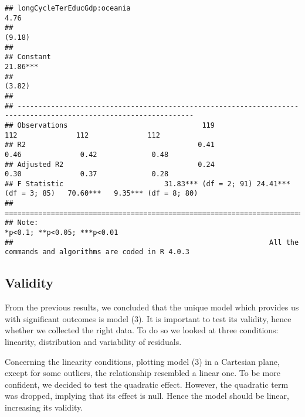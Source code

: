 \documentclass[
]{article}
\begin{document}
\begin{verbatim}
## longCycleTerEducGdp:oceania                                                                         4.76        
##                                                                                                    (9.18)       
##                                                                                                                 
## Constant                                                                         21.86***                       
##                                                                                   (3.82)                        
##                                                                                                                 
## ----------------------------------------------------------------------------------------------------------------
## Observations                                119                   112              112              112         
## R2                                         0.41                  0.46              0.42             0.48        
## Adjusted R2                                0.24                  0.30              0.37             0.28        
## F Statistic                        31.83*** (df = 2; 91) 24.41*** (df = 3; 85)   70.60***   9.35*** (df = 8; 80)
## ================================================================================================================
## Note:                                                                                *p<0.1; **p<0.05; ***p<0.01
##                                                             All the commands and algorithms are coded in R 4.0.3
\end{verbatim}

\hypertarget{validity}{%
\subsection{Validity}\label{validity}}

From the previous results, we concluded that the unique model which
provides us with significant outcomes is model (3). It is important to
test its validity, hence whether we collected the right data. To do so
we looked at three conditions: linearity, distribution and variability
of residuals.

Concerning the linearity conditions, plotting model (3) in a Cartesian
plane, except for some outliers, the relationship resembled a linear
one. To be more confident, we decided to test the quadratic effect.
However, the quadratic term was dropped, implying that its effect is
null. Hence the model should be linear, increasing its validity.
\end{document}
